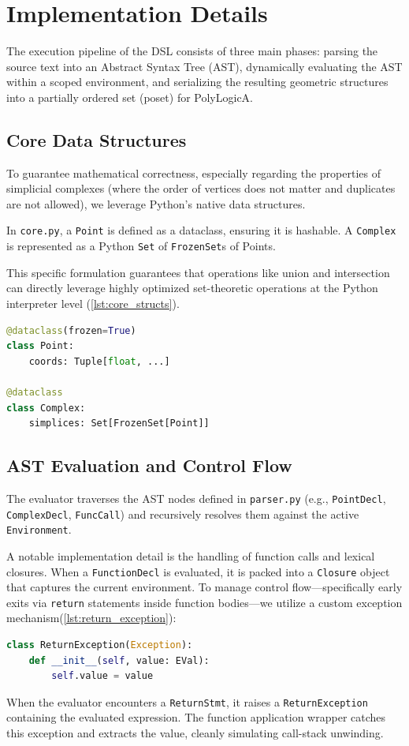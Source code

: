 \documentclass[11pt,a4paper]{article}
\begin{document}
\section{Implementation Details}
\label{sec:implementation}

The execution pipeline of the DSL consists of three main phases: parsing the source text into an Abstract Syntax Tree (AST), dynamically evaluating the AST within a scoped environment, and serializing the resulting geometric structures into a partially ordered set (poset) for PolyLogicA. 

\subsection{Core Data Structures}
To guarantee mathematical correctness, especially regarding the properties of simplicial complexes (where the order of vertices does not matter and duplicates are not allowed), we leverage Python's native data structures.

In \texttt{core.py}, a \texttt{Point} is defined as a dataclass, ensuring it is hashable. A \texttt{Complex} is represented as a Python \texttt{Set} of \texttt{FrozenSet}s of Points.

This specific formulation guarantees that operations like union and intersection can directly leverage highly optimized set-theoretic operations at the Python interpreter level (\ref{lst:core_structs}).

\begin{lstlisting}[language=Python, caption={Core Geometric Data Structures}, label={lst:core_structs}]
@dataclass(frozen=True)
class Point:
    coords: Tuple[float, ...]

@dataclass
class Complex:
    simplices: Set[FrozenSet[Point]]
\end{lstlisting}
\subsection{AST Evaluation and Control Flow}
The evaluator traverses the AST nodes defined in \texttt{parser.py} (e.g., \texttt{PointDecl}, \texttt{ComplexDecl}, \texttt{FuncCall}) and recursively resolves them against the active \texttt{Environment}.

A notable implementation detail is the handling of function calls and lexical closures. When a \texttt{FunctionDecl} is evaluated, it is packed into a \texttt{Closure} object that captures the current environment. To manage control flow—specifically early exits via \texttt{return} statements inside function bodies—we utilize a custom exception mechanism(\ref{lst:return_exception}):
\begin{lstlisting}[language=Python, caption={Exception-based Control Flow for Returns}, label={lst:return_exception}]
class ReturnException(Exception):
    def __init__(self, value: EVal):
        self.value = value
\end{lstlisting}
When the evaluator encounters a \texttt{ReturnStmt}, it raises a \texttt{ReturnException} containing the evaluated expression. The function application wrapper catches this exception and extracts the value, cleanly simulating call-stack unwinding.
\end{document}

